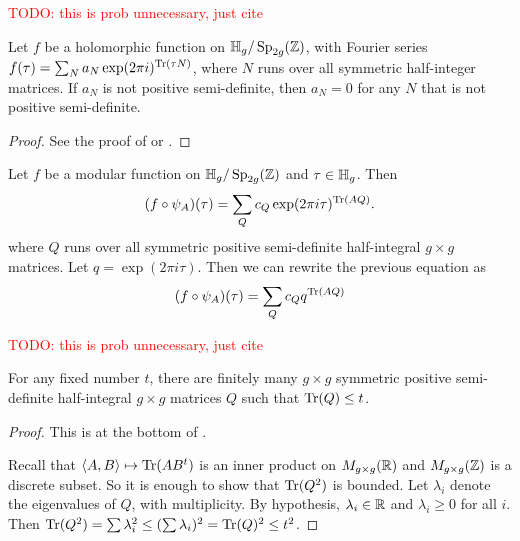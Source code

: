 \documentclass{amsart}
\begin{document}
\textcolor{red}{TODO: this is prob unnecessary, just cite}

\begin{theorem}
  Let $f$ be a holomorphic function on $\mathbb{H}_g/\operatorname{Sp}_{2g}(\mathbb{Z})$, with Fourier series $f(\tau) = \sum_N a_N \exp(2 \pi i)^{\operatorname{Tr}(\tau N)}$, where $N$ runs over all symmetric half-integer matrices. If $a_N$ is not positive semi-definite, then $a_N = 0$ for any $N$ that is not positive semi-definite.
\end{theorem}
\begin{proof}
  See the proof of \cite[Thm.~1, Pg.~45]{klingen1990introductory} or \cite[Thm.~2, Pg.~191]{bruinier2008the123}.

\end{proof}

Let $f$ be a modular function on $\mathbb{H}_g/\operatorname{Sp}_{2g}(\mathbb{Z})$ and $\tau \in \mathbb{H}_g$. Then
\[
  (f \circ \psi_A)(\tau) = \sum_Q c_Q \exp(2 \pi i \tau)^{\operatorname{Tr}(AQ)}.
\]
where $Q$ runs over all symmetric positive semi-definite half-integral $g \times g$ matrices.
Let $q = \exp(2 \pi i \tau)$. Then we can rewrite the previous equation as
\[
  (f \circ \psi_A)(\tau) = \sum_Q c_Q q^{\operatorname{Tr}(AQ)}
\]

\textcolor{red}{TODO: this is prob unnecessary, just cite}

\begin{lemma}\label{lem:finite-fixed-trace}
  For any fixed number $t$, there are finitely many $g \times g$ symmetric positive semi-definite half-integral $g \times g$ matrices $Q$ such that $\operatorname{Tr}(Q) \leq t$.
\end{lemma}
\begin{proof}
  This is at the bottom of \cite[Pg.~46]{klingen1990introductory}.

  Recall that $\langle A,B \rangle \mapsto \operatorname{Tr}(AB^t)$ is an inner product on $M_{g \times g}(\mathbb{R})$ and $M_{g \times g}(\mathbb{Z})$ is a discrete subset. So it is enough to show that $\operatorname{Tr}(Q^2)$ is bounded. Let $\lambda_i$ denote the eigenvalues of $Q$, with multiplicity. By hypothesis, $\lambda_i \in \mathbb{R}$ and $\lambda_i \geq 0$ for all $i$. Then $\operatorname{Tr}(Q^2) = \sum \lambda_i^2 \leq (\sum \lambda_i)^2 = \operatorname{Tr}(Q)^2 \leq t^2$.
\end{proof}
\end{document}
